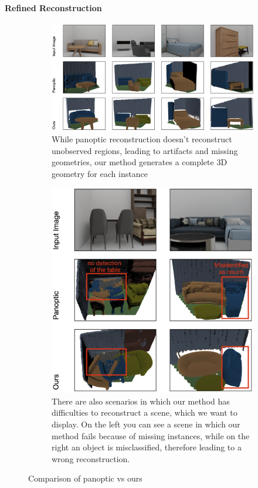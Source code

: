 \paragraph{Refined Reconstruction}

\begin{figure}%
  \begin{subfigure}[t]{109mm}
    \includegraphics[width=\linewidth]{images/image1.png}
    \caption{While panoptic reconstruction doesn't reconstruct unobserved regions, leading to artifacts and missing geometries, our method generates a complete 3D geometry for each instance}\label{fig:comparison_good}
  \end{subfigure}
  \qquad
  \begin{subfigure}[t]{56mm}
    \includegraphics[width=\linewidth]{images/image2.png}
    \caption{There are also scenarios in which our method has difficulties to reconstruct a scene, which we want to display. On the left you can see a scene in which our method fails because of missing instances, while on the right an object is misclassified, therefore leading to a wrong reconstruction.}\label{fig:comparison_bad}
  \end{subfigure}
  \caption{Comparison of panoptic vs ours}
  \label{fig:comparison_all}
\end{figure}



